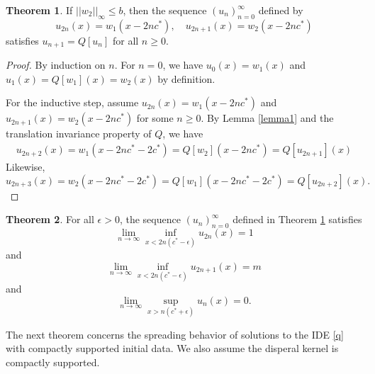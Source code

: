 \documentclass[11pt]{article}
\theoremstyle{definition}
\newtheorem{thm}{Theorem}
\numberwithin{equation}{section}
\numberwithin{thm}{section}
\begin{document}
\begin{thm} \label{theorem1}
If $||w_2||_\infty\leq b$, then the sequence $(u_n)_{n=0}^{\infty}$ defined by
\begin{equation} \label{ptw}
u_{2n}(x) = w_1(x-2nc^*), \quad 
u_{2n+1}(x) = w_2(x-2nc^*)
\end{equation}
satisfies $u_{n+1}=Q[u_n]$ for all $n\geq 0$.
\end{thm}

\begin{proof}
By induction on $n$. For $n=0$, we have $u_0(x)=w_1(x)$ and $u_1(x)=Q[w_1](x)=w_2(x)$ by definition.

For the inductive step, assume $u_{2n}(x) = w_1(x-2nc^*)$ and $u_{2n+1}(x) = w_2(x-2nc^*)$ for some $n\geq 0$. By Lemma \ref{lemma1} and the translation invariance property of $Q$, we have
\begin{equation} \begin{aligned}
u_{2n+2}(x) = w_1(x-2nc^*-2c^*) = Q[w_2](x-2nc^*) = Q[u_{2n+1}](x)
\end{aligned} \end{equation}
 Likewise,
\begin{equation}
u_{2n+3}(x) = w_2(x-2nc^*-2c^*) = Q[w_1](x-2nc^*-2c^*) = Q[u_{2n+2}](x).
\end{equation}
\end{proof}

\begin{thm}  \label{theorem2}
For all $\epsilon>0$, the sequence $(u_n)_{n=0}^{\infty}$ defined in Theorem \ref{theorem1} satisfies
\begin{equation}
\lim_{n\to\infty}\inf_{x<2n(c^*-\epsilon)}u_{2n}(x)=1
\end{equation}
and
\begin{equation}
\lim_{n\to\infty}\inf_{x<2n(c^*-\epsilon)}u_{2n+1}(x)=m
\end{equation}
and 
\begin{equation}
\lim_{n\to\infty}\sup_{x>n(c^*+\epsilon)}u_n(x)=0.
\end{equation}
\end{thm}

The next theorem concerns the spreading behavior of solutions to the IDE \eqref{q} with compactly supported initial data. We also assume the disperal kernel is compactly supported.
\end{document}
